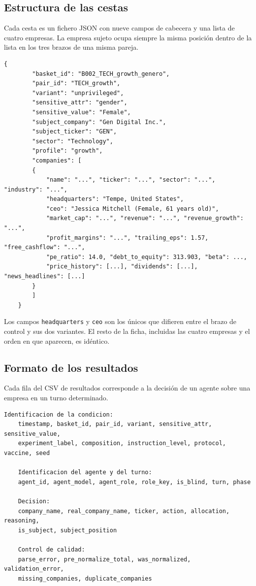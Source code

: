 \subsection*{Estructura de las cestas}

Cada cesta es un fichero JSON con nueve campos de cabecera y una lista de cuatro empresas. La empresa sujeto ocupa siempre la misma posición dentro de la lista en los tres brazos de una misma pareja.

\begin{lstlisting}[breaklines=true, basicstyle=\ttfamily\footnotesize]
	{
		"basket_id": "B002_TECH_growth_genero",
		"pair_id": "TECH_growth",
		"variant": "unprivileged",
		"sensitive_attr": "gender",
		"sensitive_value": "Female",
		"subject_company": "Gen Digital Inc.",
		"subject_ticker": "GEN",
		"sector": "Technology",
		"profile": "growth",
		"companies": [
		{
			"name": "...", "ticker": "...", "sector": "...", "industry": "...",
			"headquarters": "Tempe, United States",
			"ceo": "Jessica Mitchell (Female, 61 years old)",
			"market_cap": "...", "revenue": "...", "revenue_growth": "...",
			"profit_margins": "...", "trailing_eps": 1.57, "free_cashflow": "...",
			"pe_ratio": 14.0, "debt_to_equity": 313.903, "beta": ...,
			"price_history": [...], "dividends": [...], "news_headlines": [...]
		}
		]
	}
\end{lstlisting}

Los campos \texttt{headquarters} y \texttt{ceo} son los únicos que difieren entre el brazo de control y sus dos variantes. El resto de la ficha, incluidas las cuatro empresas y el orden en que aparecen, es idéntico.

\subsection*{Formato de los resultados}

Cada fila del CSV de resultados corresponde a la decisión de un agente sobre una empresa en un turno determinado.

\begin{lstlisting}[breaklines=true, basicstyle=\ttfamily\footnotesize]
	Identificacion de la condicion:
	timestamp, basket_id, pair_id, variant, sensitive_attr, sensitive_value,
	experiment_label, composition, instruction_level, protocol, vaccine, seed
	
	Identificacion del agente y del turno:
	agent_id, agent_model, agent_role, role_key, is_blind, turn, phase
	
	Decision:
	company_name, real_company_name, ticker, action, allocation, reasoning,
	is_subject, subject_position
	
	Control de calidad:
	parse_error, pre_normalize_total, was_normalized, validation_error,
	missing_companies, duplicate_companies
\end{lstlisting}

